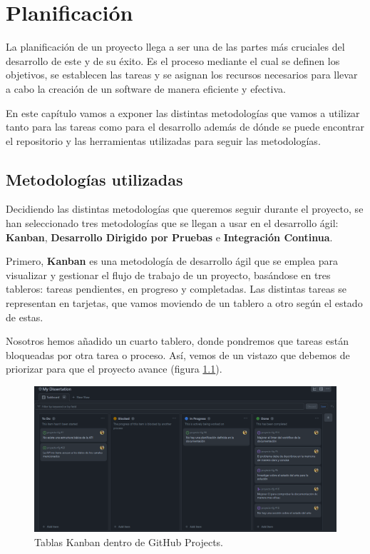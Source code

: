 \chapter{Planificación}

La planificación de un proyecto llega a ser una de las partes más cruciales del 
desarrollo de este y de su éxito. Es el proceso mediante el cual se definen los 
objetivos, se establecen las tareas y se asignan los recursos necesarios para 
llevar a cabo la creación de un software de manera eficiente y efectiva.

En este capítulo vamos a exponer las distintas metodologías que 
vamos a utilizar tanto para las tareas como para el desarrollo además de dónde se 
puede encontrar el repositorio y las herramientas utilizadas para seguir las 
metodologías.

\section{Metodologías utilizadas}

Decidiendo las distintas metodologías que queremos seguir durante el proyecto, se 
han seleccionado tres metodologías que se llegan a usar en el desarrollo ágil: 
\textbf{Kanban}, \textbf{Desarrollo Dirigido por Pruebas} e \textbf{Integración 
Continua}.

Primero, \textbf{Kanban} \cite{kanban} es una metodología de desarrollo ágil que se 
emplea para visualizar y gestionar el flujo de trabajo de un proyecto, basándose en 
tres tableros: tareas pendientes, en progreso y completadas. Las distintas tareas 
se representan en tarjetas, que vamos moviendo de un tablero a otro según el estado 
de estas.

Nosotros hemos añadido un cuarto tablero, donde pondremos que tareas están 
bloqueadas por otra tarea o proceso. Así, vemos de un vistazo que debemos de 
priorizar para que el proyecto avance (figura \ref{fig:tabla-kanban}).

\begin{figure}[h]
    \centering
    \includegraphics[scale=0.3]{figuras/github-projects-proyecto-tfg.png}
    \caption{Tablas Kanban dentro de GitHub Projects.}
    \label{fig:tabla-kanban}
\end{figure}

